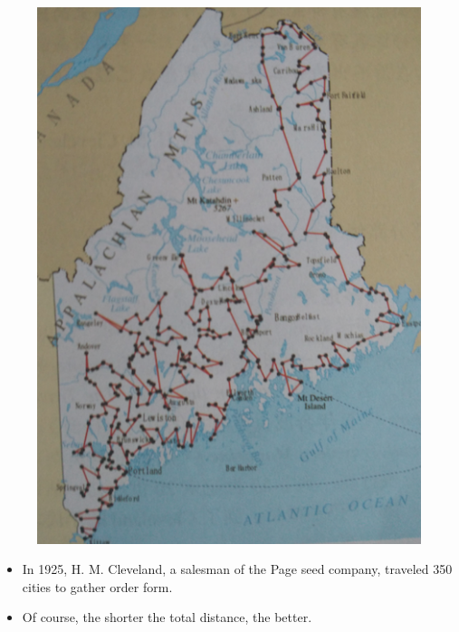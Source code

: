 \documentclass[mathserif]{beamer}
\begin{document}
{\begin{figure}
\begin{minipage}{1.5in}
        	\includegraphics[width=\textwidth]{TSP-350.png}
	\end{minipage}
    \end{figure}
\begin{itemize}
	\item In 1925, H. M. Cleveland, a salesman of the Page seed company, traveled 350 cities to gather order form. 
	\item Of course, the shorter the total distance, the better. 
\end{itemize}
}
\end{document}
